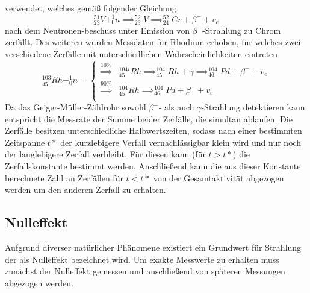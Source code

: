 verwendet, welches gemäß folgender Gleichung
\begin{equation}
^{51}_{23}V + ^1_0n \implies ^{52}_{23}V \implies ^{52}_{24}Cr + \beta^- + v_e
\end{equation}
nach dem Neutronen-beschuss unter Emission von $\beta^-$-Strahlung zu Chrom zerfällt. Des weiteren wurden 
Messdaten für Rhodium erhoben, für welches zwei verschiedene Zerfälle mit unterschiedlichen
 Wahrscheinlichkeiten eintreten
\begin{equation*}
^{103}_{45}Rh+^1_0n=
\begin{cases}
{\stackrel{10\%}{\implies}} &^{104i}_{45}Rh \implies ^{104}_{45}Rh+ \gamma \implies ^{104}_{46}Pd+\beta^-+v_e \\
{\stackrel{90\%}{\implies}} &^{104}_{45}Rh \implies ^{104}_{46}Pd+\beta^-+v_e \\
\end{cases}
\end{equation*}
Da das Geiger-Müller-Zählrohr sowohl $\beta^-$- als auch $\gamma$-Strahlung detektieren kann entspricht die
 Messrate der Summe beider Zerfälle, die simultan ablaufen. Die Zerfälle besitzen unterschiedliche 
 Halbwertszeiten, sodass nach einer bestimmten Zeitspanne $t*$ der kurzlebigere Verfall vernachlässigbar 
 klein wird und nur noch der langlebigere Zerfall verbleibt. Für diesen kann (für $t>t*$) die 
 Zerfallskonstante bestimmt werden. Anschließend kann die aus dieser Konstante berechnete Zahl an 
 Zerfällen für $t<t*$ von der Gesamtaktivität abgezogen werden um den anderen Zerfall zu erhalten.
\subsection{Nulleffekt}
Aufgrund diverser natürlicher Phänomene existiert ein Grundwert für Strahlung der als Nulleffekt 
bezeichnet wird. Um exakte Messwerte zu erhalten muss zunächst der Nulleffekt gemessen und anschließend 
von späteren Messungen abgezogen werden.
